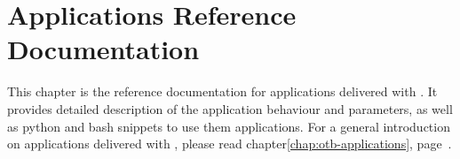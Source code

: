 \chapter{Applications Reference Documentation}\label{chap:apprefdoc}

This chapter is the reference documentation for applications delivered with \otb. It provides detailed description of the application behaviour and parameters, as well as python and bash snippets to use them applications. For a general introduction on applications delivered with \otb, please read chapter\ref{chap:otb-applications}, page~\pageref{chap:otb-applications}.


